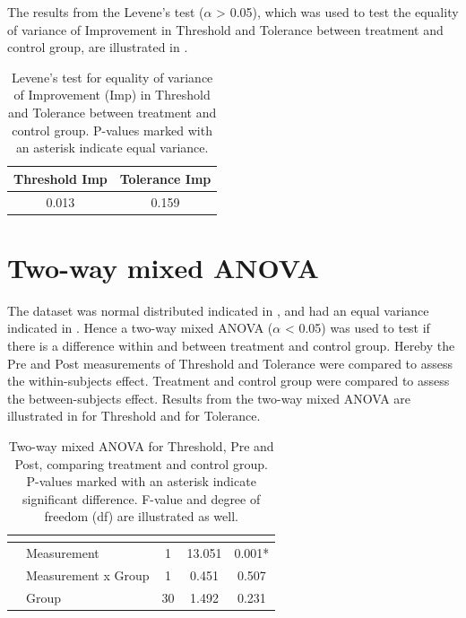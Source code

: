 The results from the Levene's test ($\alpha$ > 0.05), which was used to test the equality of variance of Improvement in Threshold and Tolerance between treatment and control group, are illustrated in .

\begin{longtable} {c|c}
\caption{Levene's test for equality of variance of Improvement (Imp) in Threshold and Tolerance between treatment and control group. P-values marked with an asterisk indicate equal variance.}
	\label{tab:Levene2} \\ 
\cellcolor[HTML]{C0C0C0} {\textbf{Threshold Imp}} & \cellcolor[HTML]{C0C0C0} {\textbf{Tolerance Imp}} \\ \hline
 0.013 & 0.159 \\ \hline
\end{longtable}
\vspace{-.5cm}

\section{Two-way mixed ANOVA}
The dataset was normal distributed indicated in , and had an equal variance indicated in  . Hence a two-way mixed ANOVA ($\alpha$ < 0.05) was used to test if there is a difference within and between treatment and control group. Hereby the Pre and Post measurements of Threshold and Tolerance were compared to assess the within-subjects effect. Treatment and control group were compared to assess the between-subjects effect. Results from the two-way mixed ANOVA are illustrated in  for Threshold and  for Tolerance. 

\begin{longtable} {l|l|c|c|c}
\caption{Two-way mixed ANOVA for Threshold, Pre and Post, comparing treatment and control group. P-values marked with an asterisk indicate significant difference. F-value and degree of freedom (df) are illustrated as well.}
	\label{tab:ANOVA1} \\
  \cellcolor[HTML]{C0C0C0}{} &  \cellcolor[HTML]{C0C0C0}{} & \multicolumn{1}{c|}{ \cellcolor[HTML]{C0C0C0}{\textbf{df}}} &
 \multicolumn{1}{c|}{ \cellcolor[HTML]{C0C0C0}{\textbf{F}}} & \multicolumn{1}{c}{ \cellcolor[HTML]{C0C0C0}{\textbf{P-value}}} \\ \hline  
\cellcolor[HTML]{C0C0C0} & Measurement & 1 & 13.051 & 0.001* \\ \cline{2-5}
\cellcolor[HTML]{C0C0C0}\multirow{-2}{*}{\textbf{Within-Subjects effect}} & Measurement x Group & 1 & 0.451 & 0.507  \\ \hline
\cellcolor[HTML]{C0C0C0}{\textbf{Between-Subjects effect}} & Group & 30 & 1.492 & 0.231 \\ \hline
\end{longtable}
\vspace{-.5cm}

